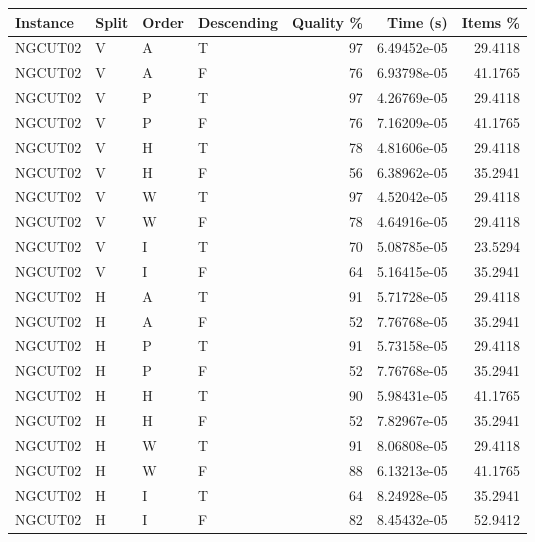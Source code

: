 \begin{tabular}{llllrrr}
    \hline
    Instance & Split & Order & Descending & Quality \% & Time (s)    & Items \% \\
    \hline
    NGCUT02  & V     & A     & T          & 97         & 6.49452e-05 & 29.4118  \\
    NGCUT02  & V     & A     & F          & 76         & 6.93798e-05 & 41.1765  \\
    NGCUT02  & V     & P     & T          & 97         & 4.26769e-05 & 29.4118  \\
    NGCUT02  & V     & P     & F          & 76         & 7.16209e-05 & 41.1765  \\
    NGCUT02  & V     & H     & T          & 78         & 4.81606e-05 & 29.4118  \\
    NGCUT02  & V     & H     & F          & 56         & 6.38962e-05 & 35.2941  \\
    NGCUT02  & V     & W     & T          & 97         & 4.52042e-05 & 29.4118  \\
    NGCUT02  & V     & W     & F          & 78         & 4.64916e-05 & 29.4118  \\
    NGCUT02  & V     & I     & T          & 70         & 5.08785e-05 & 23.5294  \\
    NGCUT02  & V     & I     & F          & 64         & 5.16415e-05 & 35.2941  \\
    NGCUT02  & H     & A     & T          & 91         & 5.71728e-05 & 29.4118  \\
    NGCUT02  & H     & A     & F          & 52         & 7.76768e-05 & 35.2941  \\
    NGCUT02  & H     & P     & T          & 91         & 5.73158e-05 & 29.4118  \\
    NGCUT02  & H     & P     & F          & 52         & 7.76768e-05 & 35.2941  \\
    NGCUT02  & H     & H     & T          & 90         & 5.98431e-05 & 41.1765  \\
    NGCUT02  & H     & H     & F          & 52         & 7.82967e-05 & 35.2941  \\
    NGCUT02  & H     & W     & T          & 91         & 8.06808e-05 & 29.4118  \\
    NGCUT02  & H     & W     & F          & 88         & 6.13213e-05 & 41.1765  \\
    NGCUT02  & H     & I     & T          & 64         & 8.24928e-05 & 35.2941  \\
    NGCUT02  & H     & I     & F          & 82         & 8.45432e-05 & 52.9412  \\

\end{tabular}
